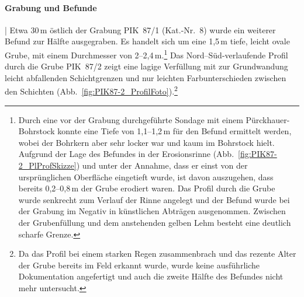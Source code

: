 \begin{table}[tb]
	\centering
	{\footnotesize }
	\caption{PIK~87/2: Anteil verschiedener Fundmaterialien.}
	\label{tab:PIK87-2_Funde}
\end{table}

\paragraph{Grabung und Befunde}\hspace{-.5em}|\hspace{.5em}%
Etwa 30\,m östlich der Grabung PIK~87/1 (Kat.-Nr.~8) wurde ein weiterer Befund zur Hälfte ausgegraben. Es handelt sich um eine 1,5\,m tiefe, leicht ovale Grube, mit einem Durchmesser von 2--2,4\,m.\footnote{Durch eine vor der Grabung durchgeführte Sondage mit einem Pürckhauer-Bohrstock konnte eine Tiefe von 1,1--1,2\,m für den Befund ermittelt werden, wobei der Bohrkern aber sehr locker war und kaum im Bohrstock hielt. Aufgrund der Lage des Befundes in der Erosionsrinne (Abb.~\ref{fig:PIK87-2_PlProfSkizze}) und unter der Annahme, dass er einst von der ursprünglichen Oberfläche eingetieft wurde, ist davon auszugehen, dass bereits 0,2--0,8\,m der Grube erodiert waren. Das Profil durch die Grube wurde senkrecht zum Verlauf der Rinne angelegt und der Befund wurde bei der Grabung im Negativ in künstlichen Abträgen ausgenommen. Zwischen der Grubenfüllung und dem anstehenden gelben Lehm besteht eine deutlich scharfe Grenze.} Das Nord--Süd-verlaufende Profil durch die Grube PIK~87/2 zeigt eine lagige Verfüllung mit zur Grundwandung leicht abfallenden Schichtgrenzen und nur leichten Farbunterschieden zwischen den Schichten (Abb.~\ref{fig:PIK87-2_ProfilFoto}).\footnote{Da das Profil bei einem starken Regen zusammenbrach und das rezente Alter der Grube bereits im Feld erkannt wurde, wurde keine ausführliche Dokumentation angefertigt und auch die zweite Hälfte des Befundes nicht mehr untersucht.}

